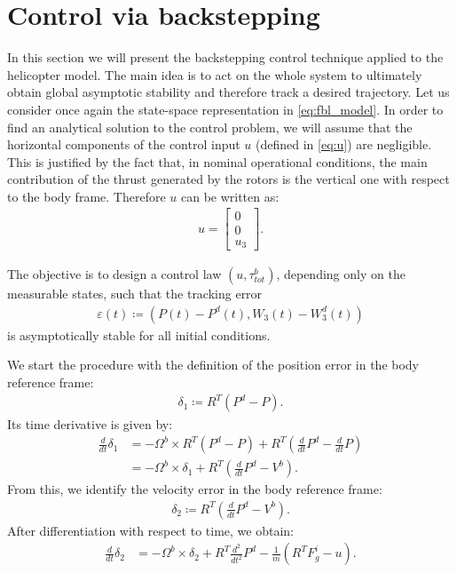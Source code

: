 \section{Control via backstepping}\label{sec:backstepping}
In this section we will present the backstepping control technique applied to the helicopter model. The main idea is to act on the whole system to ultimately obtain global asymptotic stability and therefore track a desired trajectory.
Let us consider once again the state-space representation in \ref{eq:fbl_model}. In order to find an analytical solution to the control problem, we will assume that the horizontal components of the control input $u$ (defined in \ref{eq:u}) are negligible. This is justified by the fact that, in nominal operational conditions, the main contribution of the thrust generated by the rotors is the vertical one with respect to the body frame. Therefore $u$ can be written as: 
\begin{align}
    u=
    \begin{bmatrix} 
        0 \\ 0 \\ u_3
    \end{bmatrix}. \label{eq:u3}
\end{align}

The objective is to design a control law $(u, \tau_{tot}^b)$, depending only on the measurable states, such that the tracking error
\begin{align*}
    \varepsilon(t) \coloneq (P(t)-P^d(t),W_3(t)-W_3^d(t))
\end{align*}
is asymptotically stable for all initial conditions.

We start the procedure with the definition of the position error in the body reference frame:
\begin{align*}
    \delta_1 \coloneq R^T(P^d-P).
\end{align*}
Its time derivative is given by:
\begin{align*}
    \frac{d}{dt}\delta_1 &= -\Omega^b \times R^T(P^d-P) + R^T \left( \frac{d}{dt}P^d-\frac{d}{dt}P \right) \\
    &= -\Omega^b \times \delta_1+R^T \left( \frac{d}{dt}P^d-V^b \right).
\end{align*}
From this, we identify the velocity error in the body reference frame:
\begin{align*}
    \delta_2 \coloneq R^T \left( \frac{d}{dt}P^d-V^b \right).
\end{align*}
After differentiation with respect to time, we obtain:
\begin{align*}
    \frac{d}{dt}\delta_2 &= -\Omega^b \times \delta_2+R^T \frac{d^2}{dt^2}P^d-\frac{1}{m}(R^T F_g^i -u).
\end{align*}

